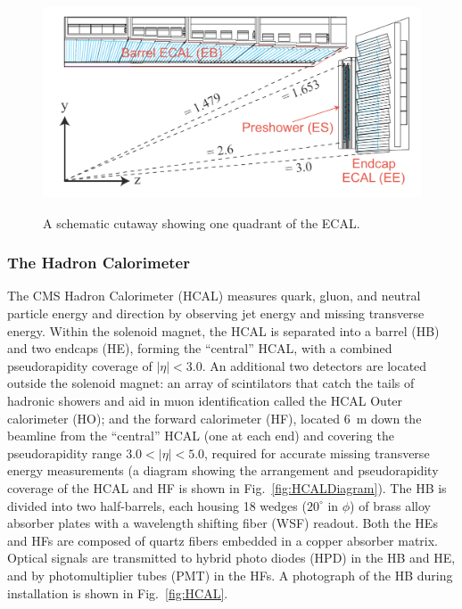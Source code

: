 \begin{figure}[H]
    \centering
    {\includegraphics[width=\textwidth]{Images/CMS/ECALDiagram.png}}
    \caption{A schematic cutaway showing one quadrant of the ECAL.}
    \label{fig:ECALDiagram}
\end{figure}

\subsubsection{The Hadron Calorimeter} \label{sec:HCAL}

The CMS Hadron Calorimeter (HCAL) \cite{HCALTDR} measures quark, gluon, and neutral particle energy and direction by observing jet energy and missing transverse energy. Within the solenoid magnet, the HCAL is separated into a barrel (HB) and two endcaps (HE), forming the ``central'' HCAL, with a combined pseudorapidity coverage of $|\eta| < 3.0$. An additional two detectors are located outside the solenoid magnet: an array of scintilators that catch the tails of hadronic showers and aid in muon identification called the HCAL Outer calorimeter (HO); and the forward calorimeter (HF), located \SI{6}{m} down the beamline from the ``central'' HCAL (one at each end) and covering the pseudorapidity range $3.0<|\eta|<5.0$, required for accurate missing transverse energy measurements (a diagram showing the arrangement and pseudorapidity coverage of the HCAL and HF is shown in Fig.~\ref{fig:HCALDiagram}). The HB is divided into two half-barrels, each housing 18 wedges ($20^{\circ}$ in $\phi$) of brass alloy absorber plates with a wavelength shifting fiber (WSF) readout. Both the HEs and HFs are composed of quartz fibers embedded in a copper absorber matrix. Optical signals are transmitted to hybrid photo diodes (HPD) in the HB and HE, and by photomultiplier tubes (PMT) in the HFs. A photograph of the HB during installation is shown in Fig.~\ref{fig:HCAL}.

